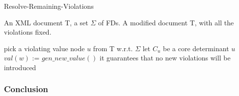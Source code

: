 \begin{algorithm}[H]
\caption{Resolve-Remaining-Violations}
\label{fixRest}
\begin{algorithmic}[1]
\REQUIRE An XML document T, a set $\Sigma$ of FDs.
\ENSURE A modified document T, with all the violations fixed.

\STATE pick a violating value node $u$ from T w.r.t. $\Sigma$
\STATE let $C_u$ be a core determinant $u$
\STATE $val(w)$ := $gen\_new\_value()$
\STATE \COMMENT it guarantees that no new violations will be introduced
\ENDFOR
\ENDWHILE
\end{algorithmic}
\end{algorithm}

\subsubsection{Conclusion}

